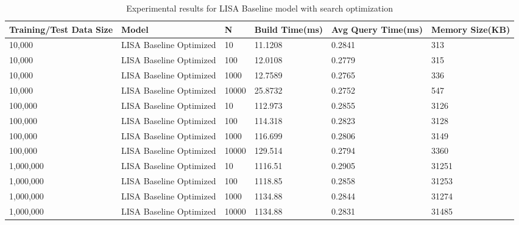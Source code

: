 \begin{table}
	\centering
	\begin{tabular}{||p{}<{\centering}|p{}<{\centering}| p{}<{\centering}|p{}<{\centering}|p{}<{\centering}|p{}<{\centering}||}
		\hline
		Training/Test Data Size& Model & N & Build Time(ms) & Avg Query Time(ms) & Memory Size(KB)\\ [0.5ex] 
		\hline
		\hline
		10,000& LISA Baseline Optimized& 10 & 11.1208 & 0.2841 & 313\\
		\hline
		10,000& LISA Baseline Optimized & 100 & 12.0108 & 0.2779 & 315\\
		\hline
		10,000& LISA Baseline Optimized & 1000 & 12.7589 & 0.2765 & 336\\
		\hline
		10,000& LISA Baseline Optimized & 10000 & 25.8732 & 0.2752 & 547\\
		\hline
		100,000& LISA Baseline Optimized & 10 & 112.973 & 0.2855 & 3126\\
		\hline
		100,000& LISA Baseline Optimized & 100 & 114.318 & 0.2823 & 3128\\
		\hline
		100,000& LISA Baseline Optimized & 1000 & 116.699 & 0.2806 & 3149\\
		\hline
		100,000& LISA Baseline Optimized & 10000 & 129.514 & 0.2794 & 3360\\
		
		\hline
		1,000,000& LISA Baseline Optimized & 10 & 1116.51 & 0.2905 & 31251\\
		\hline
		1,000,000& LISA Baseline Optimized & 100 & 1118.85 &0.2858 & 31253\\
		\hline
		1,000,000& LISA Baseline Optimized & 1000 & 1134.88 & 0.2844 & 31274\\
		\hline
		1,000,000& LISA Baseline Optimized & 10000 & 1134.88 & 0.2831 & 31485\\
		
		\hline
		\hline
	\end{tabular}
	\caption{Experimental results for LISA Baseline model with search optimization}
	\label{baseline_search_optimization_10000}

\end{table}


